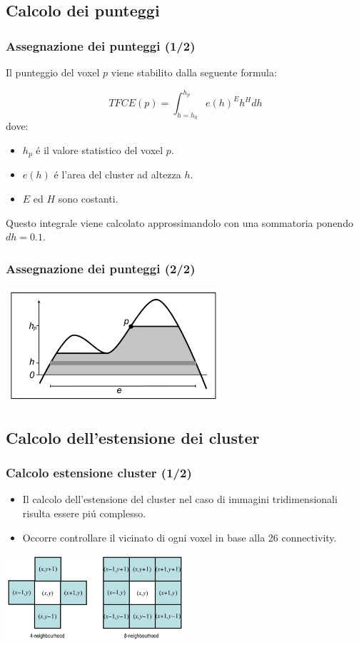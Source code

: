 \documentclass{beamer}
\begin{document}
\subsection{Calcolo dei punteggi}

\begin{frame}
\frametitle{Assegnazione dei punteggi (1/2)}
Il punteggio del voxel $p$ viene stabilito dalla seguente formula:

$$TFCE(p)=\int_{h=h_0}^{h_p}e(h)^E h^H dh$$
dove:
\begin{itemize}
\item $h_p$ \'e il \alert{valore statistico} del voxel $p$.
\item $e(h)$ \'e l'\alert{area del cluster} ad altezza $h$.
\item $E$ ed $H$ sono costanti.
\end{itemize}
\vfill
Questo integrale viene calcolato approssimandolo con una sommatoria ponendo $dh = 0.1$.

\end{frame}

\begin{frame}
\frametitle{Assegnazione dei punteggi (2/2)}
\includegraphics[width=300px]{Images/TFCE.png}
\end{frame}

\subsection{Calcolo dell'estensione dei cluster}

\begin{frame}
\frametitle{Calcolo estensione cluster (1/2)}
\begin{itemize}
\item Il calcolo dell'estensione del cluster nel caso di immagini tridimensionali risulta essere pi\'u complesso.
\item Occorre controllare il vicinato di ogni voxel in base alla \alert{26 connectivity}.
\end{itemize}
\center
\includegraphics[width=250px]{Images/connectivity.png}
\end{frame}
\end{document}
